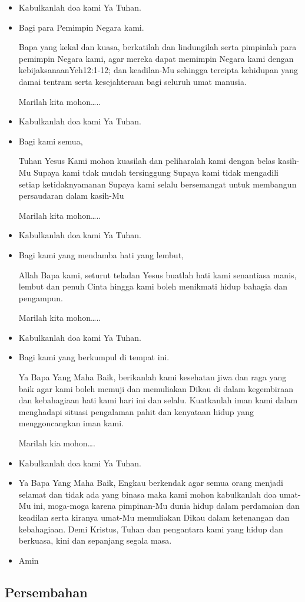 \documentclass[a4paper,12pt]{article}
\newcommand{\BU}[1]{\begin{itemize} \item[U:] #1 \end{itemize}}
\newcommand{\BP}[1]{\begin{itemize} \item[P:] #1 \end{itemize}}
\begin{document}
\BU{Kabulkanlah doa kami Ya Tuhan.}

\BP{Bagi para Pemimpin Negara kami.

Bapa yang kekal dan kuasa, berkatilah dan lindungilah serta pimpinlah para pemimpin Negara kami, agar mereka dapat
memimpin Negara kami dengan kebijaksanaanYeh12:1-12; dan keadilan-Mu sehingga tercipta kehidupan yang damai tentram serta
kesejahteraan bagi seluruh umat manusia.

Marilah kita mohon{\dots}..}

\BU{Kabulkanlah doa kami Ya Tuhan.}

\BP{Bagi kami semua,

Tuhan Yesus
Kami mohon kuasilah dan peliharalah kami dengan belas kasih-Mu
Supaya kami tdak mudah tersinggung
Supaya kami tidak mengadili setiap ketidaknyamanan
Supaya kami selalu bersemangat untuk membangun persaudaran dalam kasih-Mu


Marilah kita mohon{\dots}..}

\BU{Kabulkanlah doa kami Ya Tuhan.}

\BP{Bagi kami yang mendamba hati yang lembut,

Allah Bapa kami, seturut teladan Yesus buatlah hati kami senantiasa manis, lembut dan penuh Cinta hingga kami boleh menikmati hidup bahagia dan pengampun.

Marilah kita mohon{\dots}..}

\BU{Kabulkanlah doa kami Ya Tuhan.}

\BP{Bagi kami yang berkumpul di tempat ini.

Ya Bapa Yang Maha Baik, berikanlah kami kesehatan jiwa dan raga yang baik agar kami boleh memuji dan memuliakan Dikau di
dalam kegembiraan dan kebahagiaan hati kami hari ini dan selalu. Kuatkanlah iman kami dalam menghadapi situasi
pengalaman pahit dan kenyataan hidup yang menggoncangkan iman kami.

Marilah kia mohon{\dots}.}

\BU{Kabulkanlah doa kami Ya Tuhan.}

\BP{Ya Bapa Yang Maha Baik, Engkau berkendak agar semua orang menjadi selamat dan tidak ada yang binasa maka kami mohon
kabulkanlah doa umat-Mu ini, moga-moga karena pimpinan-Mu dunia hidup dalam perdamaian dan keadilan serta kiranya
umat-Mu memuliakan Dikau dalam ketenangan dan kebahagiaan. Demi Kristus, Tuhan dan pengantara kami yang hidup dan
berkuasa, kini dan sepanjang segala masa.}

\BU{Amin}

\subsection*{Persembahan}
\end{document}
